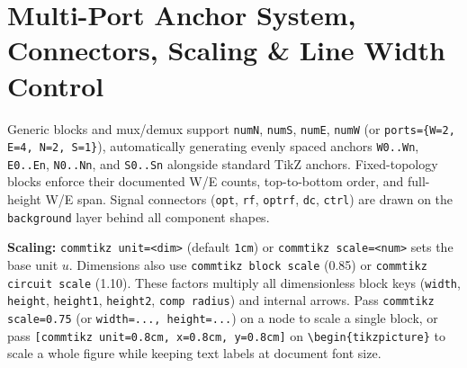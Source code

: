 \documentclass[11pt,a4paper]{article}
\begin{document}
\section{Multi-Port Anchor System, Connectors, Scaling \& Line Width Control}
Generic blocks and mux/demux support \texttt{numN}, \texttt{numS}, \texttt{numE}, \texttt{numW} (or \texttt{ports=\{W=2, E=4, N=2, S=1\}}), automatically generating evenly spaced anchors \texttt{W0..Wn}, \texttt{E0..En}, \texttt{N0..Nn}, and \texttt{S0..Sn} alongside standard TikZ anchors. Fixed-topology blocks enforce their documented W/E counts, top-to-bottom order, and full-height W/E span. Signal connectors (\texttt{opt}, \texttt{rf}, \texttt{optrf}, \texttt{dc}, \texttt{ctrl}) are drawn on the \texttt{background} layer behind all component shapes.

\smallskip
\noindent\textbf{Scaling:} \texttt{commtikz unit=<dim>} (default \texttt{1cm}) or \texttt{commtikz scale=<num>} sets the base unit $u$. Dimensions also use \texttt{commtikz block scale} (0.85) or \texttt{commtikz circuit scale} (1.10). These factors multiply all dimensionless block keys (\texttt{width}, \texttt{height}, \texttt{height1}, \texttt{height2}, \texttt{comp radius}) and internal arrows. Pass \texttt{commtikz scale=0.75} (or \texttt{width=..., height=...}) on a node to scale a single block, or pass \texttt{[commtikz unit=0.8cm, x=0.8cm, y=0.8cm]} on \texttt{\textbackslash begin\{tikzpicture\}} to scale a whole figure while keeping text labels at document font size.
\end{document}
